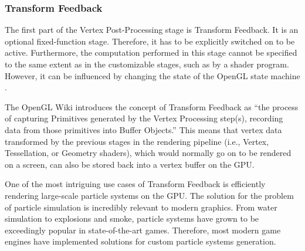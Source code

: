 \documentclass[
  digital,     %
  oneside,     %
  nosansbold,  %
  nocolorbold, %
  lof,         %
  lot,         %
]{fithesis4}
\begin{document}
\subsubsection{Transform Feedback}
The first part of the Vertex Post-Processing stage is Transform Feedback. It is an optional fixed-function stage.
Therefore, it has to be explicitly switched on to be active. Furthermore, the computation
performed in this stage cannot be specified to the same extent as in the customizable stages, such as by a shader program.
However, it can be influenced by changing the state of the OpenGL state machine \cite{openglwiki-transform-feedback}.

The OpenGL Wiki \cite{openglwiki-transform-feedback} introduces the concept of Transform Feedback as
\enquote{the process of capturing Primitives generated by the Vertex Processing step(s),
recording data from those primitives into Buffer Objects.} This means that vertex data transformed by the previous stages
in the rendering pipeline (i.e., Vertex, Tessellation, or Geometry shaders), which would normally go on to be rendered
on a screen, can also be stored back into a vertex buffer on the GPU.

One of the most intriguing use cases of Transform Feedback is efficiently rendering large-scale particle systems on the GPU.
The solution for the problem of particle simulation is incredibly relevant to modern graphics. From water simulation
to explosions and smoke, particle systems have grown to be exceedingly popular in state-of-the-art games. Therefore,
most modern game engines have implemented solutions for custom particle systems generation.
\end{document}
